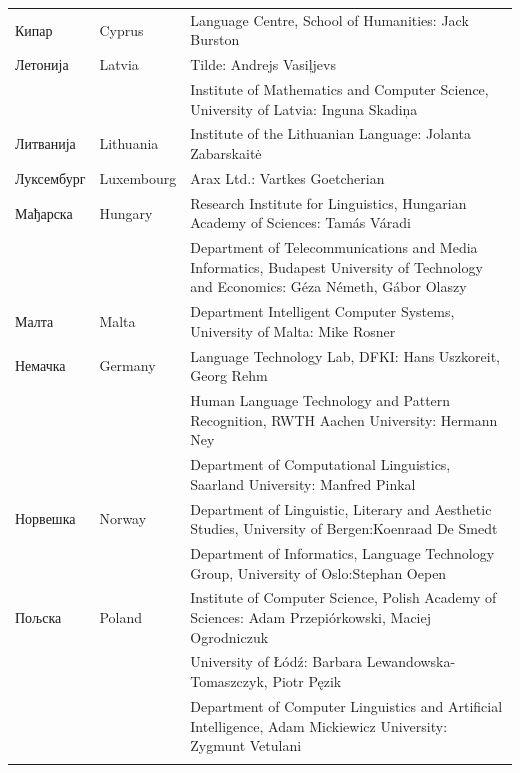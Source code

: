 {\begin{longtable}{llp{114mm}}
  Кипар & \textcolor{grey1}{Cyprus} & Language Centre, School of Humanities: Jack Burston \\ \addlinespace
  Летонија & \textcolor{grey1}{Latvia} & Tilde: Andrejs Vasiļjevs\\ \addlinespace 
  & & Institute of Mathematics and Computer Science, University of Latvia: Inguna Skadiņa\\ \addlinespace
  Литванија &  \textcolor{grey1}{Lithuania} & Institute of the Lithuanian Language: Jolanta Zabarskaitė\\ \addlinespace
  Луксембург & \textcolor{grey1}{Luxembourg} & Arax Ltd.: Vartkes Goetcherian\\ \addlinespace
  Мађарска & \textcolor{grey1}{Hungary} & Research Institute for Linguistics, Hungarian Academy of Sciences: Tamás Váradi\\  \addlinespace
  & & Department of Telecommunications and Media Informatics, Budapest University of Technology and Economics: Géza Németh, Gábor Olaszy\\ \addlinespace
  Малта & \textcolor{grey1}{Malta} & Department Intelligent Computer Systems, University of Malta: Mike Rosner\\ \addlinespace
  Немачка & \textcolor{grey1}{Germany} & Language Technology Lab, DFKI: Hans Uszkoreit, Georg Rehm\\ \addlinespace
  & & Human Language Technology and Pattern Recognition, RWTH Aachen University: Hermann Ney \\ \addlinespace
  & & Department of Computational Linguistics, Saarland University: Manfred Pinkal\\ \addlinespace 
  Норвешка &  \textcolor{grey1}{Norway} & Department of Linguistic, Literary and Aesthetic Studies, University of Bergen:\newline Koenraad De Smedt\\ \addlinespace 
  & & Department of Informatics, Language Technology Group, University of Oslo:\newline Stephan Oepen \\ \addlinespace
  Пољска &  \textcolor{grey1}{Poland} & Institute of Computer Science, Polish Academy of Sciences: Adam Przepiórkowski, Maciej Ogrodniczuk \\ \addlinespace
  & & University of Łódź: Barbara Lewandowska-Tomaszczyk, Piotr Pęzik\\ \addlinespace
  & & Department of Computer Linguistics and Artificial Intelligence, Adam Mickiewicz University: Zygmunt Vetulani \\ \addlinespace

\end{longtable}}
